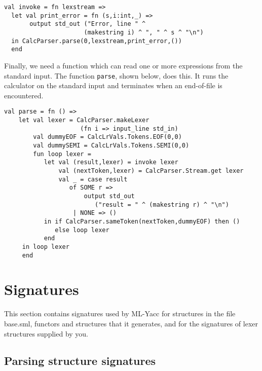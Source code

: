 \begin{verbatim}
val invoke = fn lexstream =>
  let val print_error = fn (s,i:int,_) =>
       output std_out ("Error, line " ^
                      (makestring i) ^ ", " ^ s ^ "\n")
  in CalcParser.parse(0,lexstream,print_error,())
  end
\end{verbatim}
Finally, we need a function which can read one or more expressions from
the standard input.  The function {\tt parse}, shown below, does this.
It runs the calculator on the standard input and terminates 
when an end-of-file is encountered.

\begin{verbatim}
val parse = fn () => 
    let val lexer = CalcParser.makeLexer
                     (fn i => input_line std_in)
        val dummyEOF = CalcLrVals.Tokens.EOF(0,0)
        val dummySEMI = CalcLrVals.Tokens.SEMI(0,0)
        fun loop lexer =
           let val (result,lexer) = invoke lexer
               val (nextToken,lexer) = CalcParser.Stream.get lexer
               val _ = case result
                  of SOME r =>
                      output std_out
                         ("result = " ^ (makestring r) ^ "\n")
                   | NONE => ()
           in if CalcParser.sameToken(nextToken,dummyEOF) then ()
              else loop lexer
           end
     in loop lexer
     end
\end{verbatim}

\section{Signatures}

This section contains signatures used by ML-Yacc for structures in
the file base.sml, functors and structures that it generates, and for
the signatures of lexer structures supplied by you.

\subsection{Parsing structure signatures}

